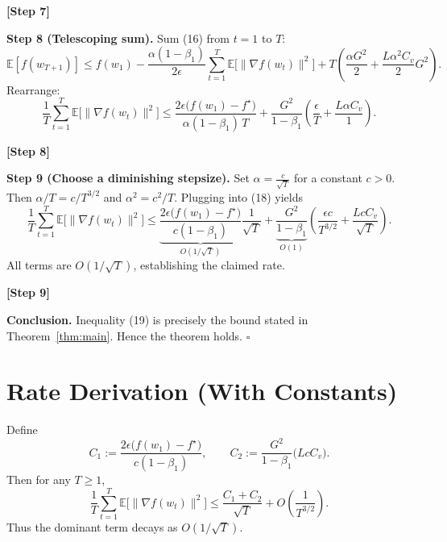 \documentclass{article}
\newcommand{\E}{\mathbb{E}}
\begin{document}
\textbf{[Step 7]}

\medskip
\noindent\textbf{Step 8 (Telescoping sum).}  
Sum (16) from $t=1$ to $T$:
\[
\E[f(w_{T+1})]\le f(w_{1})
-\frac{\alpha(1-\beta_{1})}{2\epsilon}\sum_{t=1}^{T}\E\!\bigl[\|\nabla f(w_{t})\|^{2}\bigr]
+T\left(\frac{\alpha G^{2}}{2}+ \frac{L\alpha^{2}C_{v}}{2}G^{2}\right). \tag{17}
\]
Rearrange:
\[
\frac{1}{T}\sum_{t=1}^{T}\E\!\bigl[\|\nabla f(w_{t})\|^{2}\bigr]
\le
\frac{2\epsilon\bigl(f(w_{1})-f^{\star}\bigr)}{\alpha(1-\beta_{1})\,T}
+\frac{G^{2}}{1-\beta_{1}}
\left(
\frac{\epsilon}{T}
+\frac{L\alpha C_{v}}{1}
\right). \tag{18}
\]

\textbf{[Step 8]}

\medskip
\noindent\textbf{Step 9 (Choose a diminishing stepsize).}  
Set $\alpha=\frac{c}{\sqrt{T}}$ for a constant $c>0$.
Then $\alpha/T=c/T^{3/2}$ and $\alpha^{2}=c^{2}/T$.
Plugging into (18) yields
\[
\frac{1}{T}\sum_{t=1}^{T}\E\!\bigl[\|\nabla f(w_{t})\|^{2}\bigr]
\le
\underbrace{\frac{2\epsilon\bigl(f(w_{1})-f^{\star}\bigr)}{c(1-\beta_{1})}}_{\displaystyle O(1/\sqrt{T})}
\frac{1}{\sqrt{T}}
+
\underbrace{\frac{G^{2}}{1-\beta_{1}}}_{\displaystyle O(1)}
\left(
\frac{\epsilon c}{T^{3/2}}+ \frac{L c C_{v}}{\sqrt{T}}
\right). \tag{19}
\]
All terms are $O(1/\sqrt{T})$, establishing the claimed rate.

\textbf{[Step 9]}

\medskip
\noindent\textbf{Conclusion.}  
Inequality (19) is precisely the bound stated in Theorem~\ref{thm:main}.  Hence the theorem holds. $\square$

\section*{Rate Derivation (With Constants)}
Define
\[
C_{1}:=\frac{2\epsilon\bigl(f(w_{1})-f^{\star}\bigr)}{c(1-\beta_{1})},
\qquad
C_{2}:=\frac{G^{2}}{1-\beta_{1}}\bigl(Lc C_{v}\bigr).
\]
Then for any $T\ge1$,
\[
\frac{1}{T}\sum_{t=1}^{T}\E\!\bigl[\|\nabla f(w_{t})\|^{2}\bigr]
\le \frac{C_{1}+C_{2}}{\sqrt{T}}+O\!\left(\frac{1}{T^{3/2}}\right).
\]
Thus the dominant term decays as $O(1/\sqrt{T})$.
\end{document}
